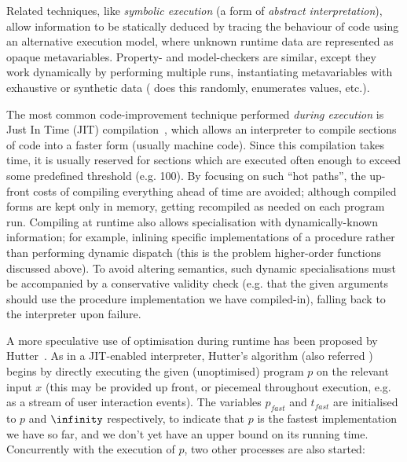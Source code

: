 Related techniques, like \emph{symbolic execution} (a form of \emph{abstract
  interpretation}), allow information to be statically deduced by tracing the
behaviour of code using an alternative execution model, where unknown runtime
data are represented as opaque metavariables. Property- and model-checkers are
similar, except they work dynamically by performing multiple runs, instantiating
metavariables with exhaustive or synthetic data (\quickcheck{} does this
randomly, \smallcheck{} enumerates values, etc.).

The most common code-improvement technique performed \emph{during execution} is
Just In Time (JIT) compilation~\iffalse TODO: Cite \fi, which allows an
interpreter to compile sections of code into a faster form (usually machine
code). Since this compilation takes time, it is usually reserved for sections
which are executed often enough to exceed some predefined threshold (e.g. 100).
By focusing on such ``hot paths'', the up-front costs of compiling everything
ahead of time are avoided; although compiled forms are kept only in memory,
getting recompiled as needed on each program run. Compiling at runtime also
allows specialisation with dynamically-known information; for example, inlining
specific implementations of a procedure rather than performing dynamic dispatch
(this is the problem higher-order functions discussed above). To avoid altering
semantics, such dynamic specialisations must be accompanied by a conservative
validity check (e.g. that the given arguments should use the procedure
implementation we have compiled-in), falling back to the interpreter upon
failure.

A more speculative use of optimisation during runtime has been proposed by
Hutter~\iffalse TODO: Cite \fi. As in a JIT-enabled interpreter, Hutter's
algorithm (also referred \hsearch{}) begins by directly executing the given
(unoptimised) program $p$ on the relevant input $x$ (this may be provided up
front, or piecemeal throughout execution, e.g. as a stream of user interaction
events). The variables $p_{fast}$ and $t_{fast}$ are initialised to $p$ and
$\infinity$ respectively, to indicate that $p$ is the fastest implementation we
have so far, and we don't yet have an upper bound on its running
time. Concurrently with the execution of $p$, two other processes are also
started:

